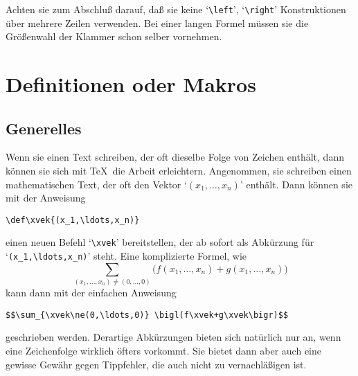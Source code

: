 Achten sie zum Abschlu\ss{} darauf, da\ss{} sie keine
`\verb|\left|',
`\verb|\right|' Konstruktionen \"uber mehrere Zeilen verwenden. Bei
einer langen Formel m\"ussen sie die Gr\"o\ss{}enwahl der
Klammer schon selber
vornehmen.
\chapter{Definitionen oder Makros}
\section{Generelles}
Wenn sie einen Text schreiben, der oft dieselbe Folge von Zeichen
enth\"alt, dann k\"onnen sie sich mit \TeX\ die Arbeit erleichtern.
Angenommen, sie schreiben einen mathematischen Text, der oft den
Vektor `$(x_1,\ldots,x_n)$' enth\"alt. Dann k\"onnen sie mit der Anweisung
\begin{verbatim}
\def\xvek{(x_1,\ldots,x_n)}
\end{verbatim}
einen 
neuen Befehl `\verb|\xvek|' bereitstellen, der ab sofort als
Abk\"urzung f\"ur `\verb|(x_1,\ldots,x_n)|' steht. Eine komplizierte
Formel, wie
$$\sum_{(x_1,\ldots,x_n)\ne(0,\ldots,0)}
\bigl(f(x_1,\ldots,x_n)+g(x_1,\ldots,x_n)\bigr)$$
kann dann mit der einfachen Anweisung
\begin{verbatim}
$$\sum_{\xvek\ne(0,\ldots,0)} \bigl(f\xvek+g\xvek\bigr)$$
\end{verbatim}
geschrieben werden. Derartige 
Abk\"urzungen bieten sich nat\"urlich nur
an, wenn eine Zeichenfolge wirklich \"ofters vorkommt. Sie bietet dann
aber auch eine gewisse Gew\"ahr gegen 
Tippfehler, die auch nicht zu vernachl\"a\ss{}igen ist.

